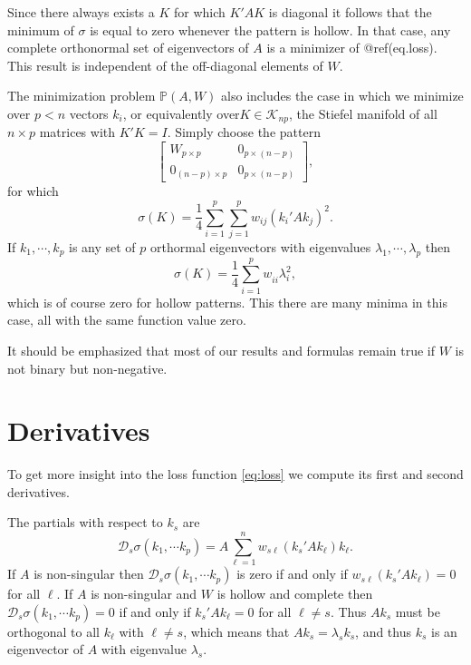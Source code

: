\documentclass[
  12pt,
]{article}
\begin{document}
Since there always exists a \(K\) for which \(K'AK\) is diagonal it follows that the minimum of \(\sigma\)
is equal to zero whenever the pattern is hollow. In that case, any complete orthonormal set of eigenvectors of \(A\) is a minimizer of @ref(eq.loss). This result is independent of the off-diagonal elements of \(W\).

The minimization problem \(\mathbb{P}(A,W)\) also includes the case in which we minimize over
\(p<n\) vectors \(k_i\), or equivalently over\(K\in\mathcal{K}_{np}\), the Stiefel manifold of all \(n\times p\) matrices with \(K'K=I\). Simply choose the pattern
\begin{equation}
\begin{bmatrix}
W_{p\times p}&0_{p\times (n-p)}\\
0_{(n-p)\times p}&0_{p\times(n-p)}
\end{bmatrix},
\label{eq:parpat}
\end{equation}
for which
\begin{equation}
\sigma(K)=\frac14\sum_{i=1}^p\sum_{j=1}^pw_{ij}(k_i'Ak_j)^2.
\label{eq:parloss}
\end{equation}
If \(k_1,\cdots,k_p\) is any set of \(p\) orthormal eigenvectors with eigenvalues
\(\lambda_1,\cdots,\lambda_p\) then
\begin{equation}
\sigma(K)=\frac14\sum_{i=1}^pw_{ii}^{\ }\lambda_i^2,
\label{eq:evecloss}
\end{equation}
which is of course zero for hollow patterns. This there are many minima in this
case, all with the same function value zero.

It should be emphasized that most of our results and formulas remain true if \(W\) is not binary but non-negative.

\section{Derivatives}\label{derivatives}

To get more insight into the loss function \eqref{eq:loss} we compute its first and
second derivatives.

The partials with respect to \(k_s\) are
\begin{equation}
\mathcal{D}_s\sigma(k_1,\cdots k_p)=A\sum_{\ell=1}^nw_{s\ell}(k_s'Ak_\ell)k_\ell.
\label{eq:grad}
\end{equation}
If \(A\) is non-singular then \(\mathcal{D}_s\sigma(k_1,\cdots k_p)\) is zero if and only if \(w_{s\ell}(k_s'Ak_\ell)=0\) for all \(\ell\). If \(A\) is non-singular and \(W\) is hollow and complete then \(\mathcal{D}_s\sigma(k_1,\cdots k_p)=0\) if and only if \(k_s'Ak_\ell=0\) for all \(\ell\not= s\). Thus \(Ak_s\) must be orthogonal to all \(k_\ell\) with \(\ell\not= s\), which means that
\(Ak_s=\lambda_s k_s\), and thus \(k_s\) is an eigenvector of \(A\) with eigenvalue \(\lambda_s\).
\end{document}
